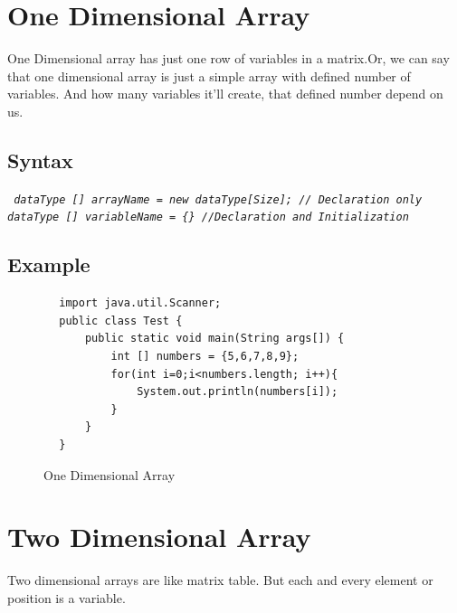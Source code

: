 \documentclass[openany]{book}  %
\begin{document}
\section{One Dimensional Array}
One Dimensional array has just one row of variables in a matrix.Or, we can say \\
that one dimensional array is just a simple array with defined number of \\
variables. And how many variables it'll create, that defined number depend on \\ us.
% 
%
\subsection{Syntax}
\begin{center}
    \tt{
        \textit{dataType [] arrayName = new dataType[Size]; // Declaration only \\
            dataType [] variableName = \{\} //Declaration and Initialization }
    }
\end{center}
% 
%
\subsection{Example}
\begin{center}
    \begin{verbatim}
        import java.util.Scanner;
        public class Test {
            public static void main(String args[]) {
                int [] numbers = {5,6,7,8,9};
                for(int i=0;i<numbers.length; i++){
                    System.out.println(numbers[i]);
                }
            }
        }
    \end{verbatim}
\end{center}
% 
% 
\begin{figure}[h!t]
    \begin{center}
        \caption{One Dimensional Array}
    \end{center}
\end{figure}
% 
% 
\section{Two Dimensional Array}
Two dimensional arrays are like matrix table. But each and every
element or position is a variable.
% 
% 
\end{document}
